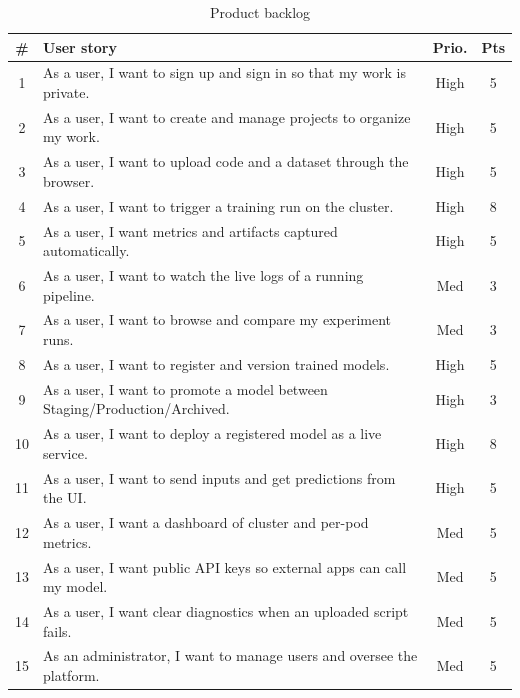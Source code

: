 \begin{table}[H]\centering
\caption{Product backlog}\label{tab:backlog}
\renewcommand{\arraystretch}{1.15}
\small
\begin{tabularx}{\textwidth}{|c|X|c|c|}
\hline
\rowcolor{primary!15}
\textbf{\#} & \textbf{User story} & \textbf{Prio.} & \textbf{Pts}\\
\hline
1  & As a user, I want to sign up and sign in so that my work is private.        & High & 5\\ \hline
2  & As a user, I want to create and manage projects to organize my work.        & High & 5\\ \hline
3  & As a user, I want to upload code and a dataset through the browser.         & High & 5\\ \hline
4  & As a user, I want to trigger a training run on the cluster.                 & High & 8\\ \hline
5  & As a user, I want metrics and artifacts captured automatically.             & High & 5\\ \hline
6  & As a user, I want to watch the live logs of a running pipeline.             & Med  & 3\\ \hline
7  & As a user, I want to browse and compare my experiment runs.                 & Med  & 3\\ \hline
8  & As a user, I want to register and version trained models.                   & High & 5\\ \hline
9  & As a user, I want to promote a model between Staging/Production/Archived.   & High & 3\\ \hline
10 & As a user, I want to deploy a registered model as a live service.           & High & 8\\ \hline
11 & As a user, I want to send inputs and get predictions from the UI.           & High & 5\\ \hline
12 & As a user, I want a dashboard of cluster and per-pod metrics.               & Med  & 5\\ \hline
13 & As a user, I want public API keys so external apps can call my model.       & Med  & 5\\ \hline
14 & As a user, I want clear diagnostics when an uploaded script fails.          & Med  & 5\\ \hline
15 & As an administrator, I want to manage users and oversee the platform.       & Med  & 5\\ \hline
\end{tabularx}
\end{table}

